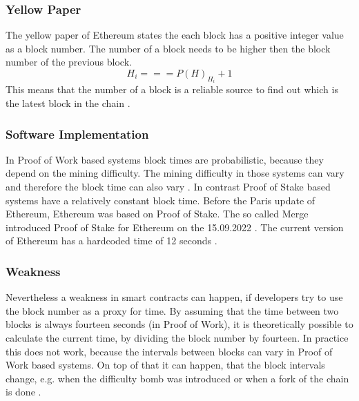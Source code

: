 \subsubsection{Yellow Paper}
The yellow paper of Ethereum states the each block has a positive integer value as a block number.
The number of a block needs to be higher then the block number of the previous block.
\begin{equation} \label{eq:blocknumber}
    H_i === P(H)_{H_i} + 1
\end{equation}
This means that the number of a block is a reliable source to find out which is the latest block in the chain \cite{ethyellowpaper2023}.

\subsubsection{Software Implementation}
In Proof of Work based systems block times are probabilistic, because they depend on the mining difficulty.
The mining difficulty in those systems can vary and therefore the block time can also vary \cite{eth_blocks}. \newline
In contrast Proof of Stake based systems have a relatively constant block time.
Before the Paris update of Ethereum, Ethereum was based on Proof of Stake. The so called Merge introduced Proof of Stake for Ethereum
on the 15.09.2022 \cite{eth_history}. The current version of Ethereum has a hardcoded time of 12 seconds \cite{eth_blocks}. \newline

\subsubsection{Weakness}
Nevertheless a weakness in smart contracts can happen, if developers try to use the block number as a proxy for time.
By assuming that the time between two blocks is always fourteen seconds (in Proof of Work), it is theoretically possible to
calculate the current time, by dividing the block number by fourteen. In practice this does not work,
because the intervals between blocks can vary in Proof of Work based systems. On top of that it can happen, that the
block intervals change, e.g. when the difficulty bomb was introduced or when a fork of the chain is done \cite{swc116}.
